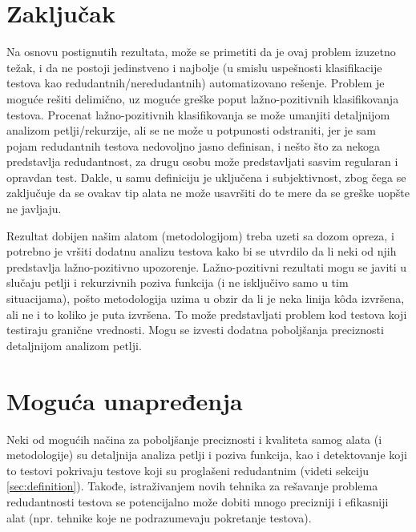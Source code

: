 \documentclass[a4paper]{article}
\begin{document}
\section{Zaključak}
\label{sec:zakljucak}
Na osnovu postignutih rezultata, može se primetiti da je ovaj problem izuzetno težak, i da ne postoji jedinstveno i najbolje (u smislu uspešnosti klasifikacije testova kao redudantnih/neredudantnih) automatizovano rešenje. Problem je moguće rešiti delimično, uz moguće greške poput lažno-pozitivnih klasifikovanja testova. Procenat lažno-pozitivnih klasifikovanja se može umanjiti detaljnijom analizom petlji/rekurzije, ali se ne može u potpunosti odstraniti, jer je sam pojam redudantnih testova nedovoljno jasno definisan, i nešto što za nekoga predstavlja redudantnost, za drugu osobu može predstavljati sasvim regularan i opravdan test. Dakle, u samu definiciju je uključena i subjektivnost, zbog čega se zaključuje da se ovakav tip alata ne može usavršiti do te mere da se greške uopšte ne javljaju.

Rezultat dobijen našim alatom (metodologijom) treba uzeti sa dozom opreza, i potrebno je vršiti dodatnu analizu testova kako bi se utvrdilo da li neki od njih predstavlja lažno-pozitivno upozorenje. Lažno-pozitivni rezultati mogu se javiti u slučaju petlji i rekurzivnih poziva funkcija (i ne isključivo samo u tim situacijama), pošto metodologija uzima u obzir da li je neka linija kôda izvršena, ali ne i to koliko je puta izvršena. To može predstavljati problem kod testova koji testiraju granične vrednosti. Mogu se izvesti dodatna poboljšanja preciznosti detaljnijom analizom petlji.

\section{Moguća unapređenja}
\label{sec:unapredjenja}
Neki od mogućih načina za poboljšanje preciznosti i kvaliteta samog alata (i metodologije) su detaljnija analiza petlji i poziva funkcija, kao i detektovanje koji to testovi pokrivaju testove koji su proglašeni redudantnim (videti sekciju \ref{sec:definition}). Takođe, istraživanjem novih tehnika za rešavanje problema redudantnosti testova se potencijalno može dobiti mnogo precizniji i efikasniji alat (npr. tehnike koje ne podrazumevaju pokretanje testova).
\end{document}
